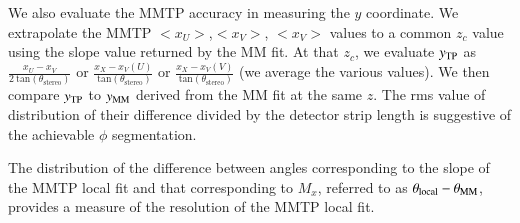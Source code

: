  We also evaluate the MMTP accuracy in measuring the $y$ coordinate. We extrapolate the MMTP $<x_U>$,$< x_V>$, $<x_V>$ values to
 a common $z_c$ value using the slope value returned by the MM fit. At that $z_c$, we evaluate $y_{\rm TP}$
 as   $\frac{x_U - x_V}{2\ \text{tan}(\theta_\text{stereo})}$ or  $\frac{x_X - x_V(U)}{\ \text{tan}(\theta_\text{stereo})}$
 or  $\frac{x_X - x_V(V)}{\ \text{tan}(\theta_\text{stereo})}$ (we average the various values).
 We then  compare  $y_{\rm TP}$ to  $y_{\rm MM}$ derived from the MM fit at the same $z$. The rms value of distribution
 of their difference divided by the detector strip length is suggestive of the achievable $\phi$ segmentation.  

 The distribution of the difference between angles corresponding to the slope of the MMTP local fit and that corresponding to $M_x$,
 referred to as $\theta_{\rm local}-\theta_{\rm MM} $,
 provides a measure of the resolution of the MMTP local fit.
  


